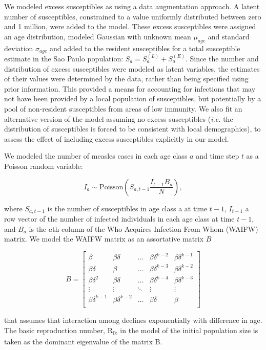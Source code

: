 We modeled excess susceptibles as using a data augmentation approach. A latent number of susceptibles, constrained to a value uniformly distributed between zero and 1 million, were added to the model. These excess susceptibles were assigned an age distribution, modeled Gaussian with unknown mean \(\mu_{age}\) and standard deviation \(\sigma_{age}\) and added to the resident susceptibles for a total susceptible estimate in the Sao Paulo population: \(S_a = S_a^{(L)} + S_a^{(E)}\). Since the number and distribution of excess susceptibles were modeled as latent variables, the estimates of their values were determined by the data, rather than being specified using prior information. This provided a means for accounting for infections that may not have been provided by a local population of susceptibles, but potentially by a pool of non-resident susceptibles from areas of low immunity. We also fit an alternative version of the model assuming no excess susceptibles (\emph{i.e.} the distribution of susceptibles is forced to be consistent with local demographics), to assess the effect of including excess susceptibles explicitly in our model.

We modeled the number of measles cases in each age class \(a\) and time step \(t\) as a Poisson random variable:

\[I_a \sim \text{Poisson}\left(S_{a,t-1} \frac{I_{t-1}B_a}{N} \right),\] 

where \(S_{a,t-1}\) is the number of susceptibles in age class a at time \(t-1\), \(I_{t-1}\) a row vector of the number of infected individuals in each age class at time \(t-1\), and \(B_a\) is the \(a\)th column of the Who Acquires Infection From Whom (WAIFW) matrix.  We model the WAIFW matrix as an assortative matrix \(B\)

\[B = \left[{
\begin{array}{c}
  {\beta} & {\beta \delta} & \ldots & {\beta \delta^{k-2}} & {\beta \delta^{k-1}}  \\
  {\beta \delta} & {\beta} & \ldots & {\beta \delta^{k-3}} & {\beta \delta^{k-2}} \\
{\beta \delta^2} & {\beta \delta} & \ldots & {\beta \delta^{k-4}} & {\beta \delta^{k-3}}  \\
  \vdots & \vdots & \ddots & \vdots & \vdots \\
  {\beta \delta^{k-1}} & {\beta \delta^{k-2}} & \ldots & {\beta \delta} & {\beta}  \\
\end{array}
}\right]\]

that assumes that interaction among declines exponentially with
difference in age. The basic reproduction number, R\textsubscript{0}, in
the model of the initial population size is taken as the dominant
eigenvalue of the matrix B.